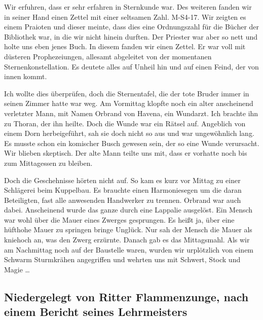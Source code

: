Wir erfuhren, dass er sehr erfahren in Sternkunde war. Des weiteren fanden wir in seiner Hand einen Zettel mit einer seltsamen Zahl. M-S4-17. Wir zeigten es einem Praioten und dieser meinte, dass dies eine Ordnungszahl für die Bücher der Bibliothek war, in die wir nicht hinein durften. Der Priester war aber so nett und holte uns eben jenes Buch. In diesem fanden wir einen Zettel. Er war voll mit düsteren Prophezeiungen, allesamt abgeleitet von der momentanen Sternenkonstellation. Es deutete alles auf Unheil hin und auf einen Feind, der von innen kommt.\par

Ich wollte dies überprüfen, doch die Sternentafel, die der tote Bruder immer in seinen Zimmer hatte war weg. Am Vormittag klopfte noch ein alter anscheinend verletzter Mann, mit Namen Orbrand von Havena, ein Wundarzt. Ich brachte ihn zu Thoran, der ihn heilte. Doch die Wunde war ein Rätsel auf. Angeblich von einem Dorn herbeigeführt, sah sie doch nicht so aus und war ungewöhnlich lang. Es musste schon ein komischer Busch gewesen sein, der so eine Wunde verursacht. Wir blieben skeptisch. Der alte Mann teilte uns mit, dass er vorhatte noch bis zum Mittagessen zu bleiben. \par

Doch die Geschehnisse hörten nicht auf. So kam es kurz vor Mittag zu einer Schlägerei beim Kuppelbau. Es brauchte einen Harmoniesegen um die daran Beteiligten, fast alle anwesenden Handwerker zu trennen. Orbrand war auch dabei. Anscheinend wurde das ganze durch eine Lappalie ausgelöst. Ein Mensch war wohl über die Mauer eines Zwerges gesprungen. Es heißt ja, über eine hüfthohe Mauer zu springen bringe Unglück. Nur sah der Mensch die Mauer als kniehoch an, was den Zwerg erzürnte. Danach gab es das Mittagsmahl. Als wir am Nachmittag noch auf der Baustelle waren, wurden wir urplötzlich von einem Schwarm Sturmkrähen angegriffen und wehrten uns mit Schwert, Stock und Magie …

\subsection{Niedergelegt von Ritter Flammenzunge, nach einem Bericht seines Lehrmeisters}

